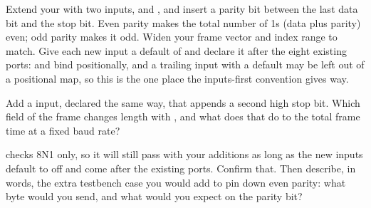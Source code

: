  Extend your  with two inputs,  and , and
insert a parity bit between the last data bit and the stop bit. Even parity makes the total number
of 1s (data plus parity) even; odd parity makes it odd. Widen your frame vector and index range to
match. Give each new input a default of  and declare it after the eight existing ports:
 and  bind positionally, and a trailing input with a default may be
left out of a positional map, so this is the one place the inputs-first convention gives way.

 Add a  input, declared the same way, that appends a second high stop bit.
Which field of the frame changes length with , and what does that do to the total
frame time at a fixed baud rate?

  checks 8N1 only, so it will still pass with your additions as long as
the new inputs default to off and come after the existing ports. Confirm that. Then describe, in
words, the extra testbench case you would add to pin down even parity: what byte would you send,
and what would you expect on the parity bit?
